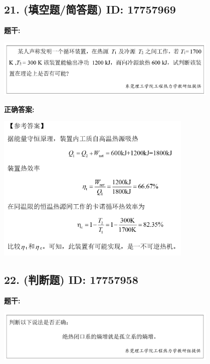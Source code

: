 \documentclass[12pt]{article}
\begin{document}
\vspace{0.5em}\hrulefill\vspace{1em}

\subsection*{21. (填空题/简答题) \small ID: 17757969}

\textbf{题干:}


\begin{center}\includegraphics[width=0.8\textwidth, height=0.25\textheight, keepaspectratio]{question_21_17757969/title_img_1.png}\end{center}

\textbf{正确答案:}

\begin{center}\includegraphics[width=0.7\textwidth, height=0.2\textheight, keepaspectratio]{question_21_17757969/correct_answer_1_img_1.png}\end{center}

\vspace{0.5em}\hrulefill\vspace{1em}

\subsection*{22. (判断题) \small ID: 17757958}

\textbf{题干:}


\begin{center}\includegraphics[width=0.8\textwidth, height=0.25\textheight, keepaspectratio]{question_22_17757958/title_img_1.png}\end{center}
\end{document}
